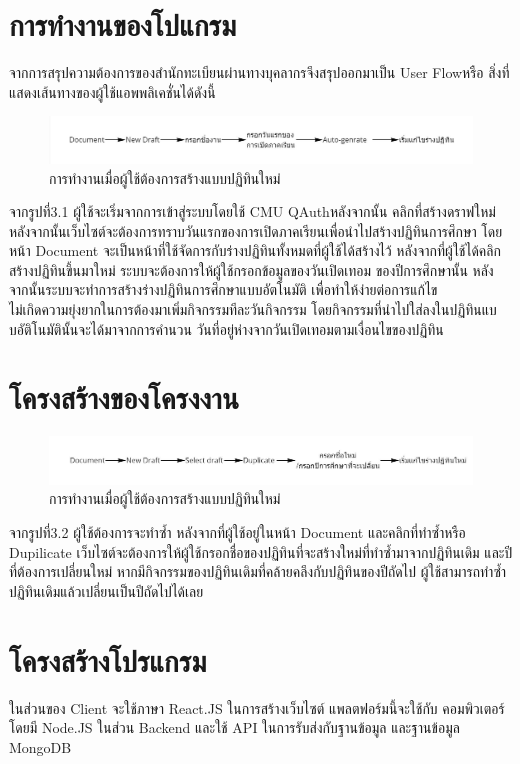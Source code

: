 \section{การทำงานของโปแกรม}
จากการสรุปความต้องการของสำนักทะเบียนผ่านทางบุคลากรจึงสรุปออกมาเป็น User Flowหรือ
สิ่งที่แสดงเส้นทางของผู้ใช้แอพพลิเคชั่นได้ดังนี้
\begin{figure}[h]
\centering
\includegraphics[width=1\textwidth]{pic3.1.jpg}
\caption{การทำงานเมื่อผู้ใช้ต้องการสร้างแบบปฏิทินใหม่}
\end{figure}
จากรูปที่3.1 ผู้ใช้จะเริ่มจากการเข้าสู่ระบบโดยใช้ CMU QAuthหลังจากนั้น คลิกที่สร้างดราฟใหม่ 
หลังจากนั้นเว็บไซต์จะต้องการทราบวันแรกของการเปิดภาคเรียนเพื่อนำไปสร้างปฏิทินการศึกษา
โดยหน้า Document จะเป็นหน้าที่ใช้จัดการกับร่างปฏิทินทั้งหมดที่ผู้ใช้ได้สร้างไว้
หลังจากที่ผู้ใช้ได้คลิกสร้างปฏิทินขึ้นมาใหม่ ระบบจะต้องการให้ผู้ใช้กรอกข้อมูลของวันเปิดเทอม
ของปีการศึกษานั้น หลังจากนั้นระบบจะทำการสร้างร่างปฏิทินการศึกษาแบบอัตโนมัติ
เพื่อทำให้ง่ายต่อการแก้ไข \\ ไม่เกิดความยุ่งยากในการต้องมาเพิ่มกิจกรรมทีละวันกิจกรรม
โดยกิจกรรมที่นำไปใส่ลงในปฏิทินแบบอัติโนมัตินั้นจะได้มาจากการคำนวน
วันที่อยู่ห่างจากวันเปิดเทอมตามเงื่อนไขของปฏิทิน

\section{โครงสร้างของโครงงาน}

\begin{figure}[h]
\centering
\includegraphics[width=1\textwidth]{pic3.2.jpg}
\caption{การทำงานเมื่อผู้ใช้ต้องการสร้างแบบปฏิทินใหม่}
\end{figure}

จากรูปที่3.2 ผู้ใช้ต้องการจะทำซ้ำ หลังจากที่ผู้ใช้อยู่ในหน้า Document และคลิกที่ทำซ้ำหรือ \\ Dupilicate
เว็บไซต์จะต้องการให้ผู้ใช้กรอกชื่อของปฏิทินที่จะสร้างใหม่ที่ทำซ้ำมาจากปฏิทินเดิม
และปีที่ต้องการเปลี่ยนใหม่ หากมีกิจกรรมของปฏิทินเดิมที่คล้ายคลึงกับปฏิทินของปีถัดไป 
ผู้ใช้สามารถทำซ้ำปฏิทินเดิมแล้วเปลี่ยนเป็นปีถัดไปได้เลย

\section{โครงสร้างโปรแกรม}
ในส่วนของ Client จะใช้ภาษา React.JS ในการสร้างเว็บไซต์ แพลตฟอร์มนี้จะใช้กับ
คอมพิวเตอร์ โดยมี Node.JS ในส่วน Backend และใช้ API ในการรับส่งกับฐานข้อมูล
และฐานข้อมูล MongoDB